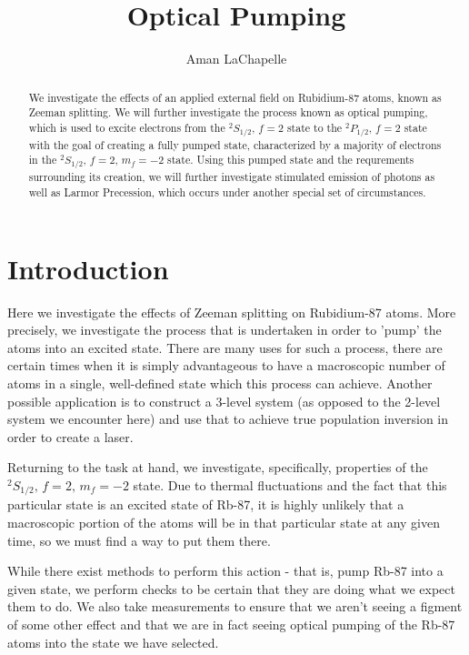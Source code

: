 \documentclass{article}
\title{Optical Pumping}
\author{Aman LaChapelle}
\newcommand{\twohalfmf}[2]{$^2 #1_{1/2},\, f = 2,\, m_f = #2$}
\newcommand{\twohalf}[1]{$^2 #1_{1/2},\, f = 2$}
\begin{document}
\raggedright
\maketitle

\begin{abstract}
  We investigate the effects of an applied external field on Rubidium-87 atoms, known as Zeeman splitting.  We will further investigate the process known as optical pumping, which is used to excite electrons from the \twohalf{S} state to the \twohalf{P} state with the goal of creating a fully pumped state, characterized by a majority of electrons in the \twohalfmf{S}{-2} state.  Using this pumped state and the requrements surrounding its creation, we will further investigate stimulated emission of photons as well as Larmor Precession, which occurs under another special set of circumstances.
\end{abstract}

\tableofcontents
\newpage

\section{Introduction}%
  Here we investigate the effects of Zeeman splitting on Rubidium-87 atoms.  More precisely, we investigate the process that is undertaken in order to 'pump' the atoms into an excited state.  There are many uses for such a process, there are certain times when it is simply advantageous to have a macroscopic number of atoms in a single, well-defined state which this process can achieve.  Another possible application is to construct a 3-level system (as opposed to the 2-level system we encounter here) and use that to achieve true population inversion in order to create a laser.

  \hspace{.25cm}

  Returning to the task at hand, we investigate, specifically, properties of the \twohalfmf{S}{-2} state.  Due to thermal fluctuations and the fact that this particular state is an excited state of Rb-87, it is highly unlikely that a macroscopic portion of the atoms will be in that particular state at any given time, so we must find a way to put them there.

  \hspace{.25cm}

  While there exist methods to perform this action - that is, pump Rb-87 into a given state, we perform checks to be certain that they are doing what we expect them to do.  We also take measurements to ensure that we aren't seeing a figment of some other effect and that we are in fact seeing optical pumping of the Rb-87 atoms into the state we have selected.
\end{document}
